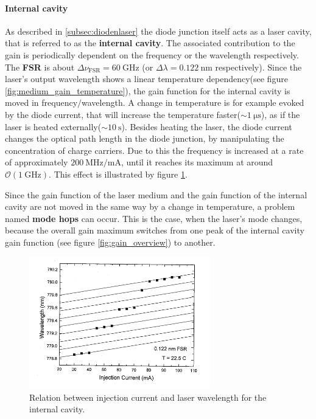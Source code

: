 \paragraph{Internal cavity}
As described in \ref{subsec:diodenlaser} the diode junction itself
acts as a laser cavity, that is referred to as the \textbf{internal cavity}.
The associated contribution to the gain is periodically dependent on
the frequency or the wavelength respectively. The \textbf{FSR} is about
$\Delta\nu_{\text{FSR}} = \SI{60}{\giga\hertz}$ (or
$\Delta\lambda = \SI{0.122}{\nano\meter}$ respectively).
Since the laser's output wavelength shows a linear
temperature dependency(see figure \ref{fig:medium_gain_temperature}),
the gain function for the internal cavity is moved in frequency$/$wavelength.
A change in temperature is for example evoked by the diode current,
that will increase the temperature faster($\sim \SI{1}{\micro\second}$),
as if the laser is heated externally($\sim \SI{10}{\second}$).
Besides heating the laser, the diode current changes the optical
path length in the diode junction, by manipulating the concentration
of charge carriers. Due to this the frequency is increased at a rate of
approximately $\SI{200}{\mega\hertz\per\milli\ampere}$, until it reaches
its maximum at around $\mathcal{O}(\SI{1}{\giga\hertz})$.
This effect is illustrated by figure \ref{fig:injectioncurrent_wavelength}.


Since the gain function of the laser medium and the gain function of
the internal cavity are not moved in the same way by a change in temperature,
a problem named \textbf{mode hops} can occur. This is the case,
when the laser's mode changes, because the overall gain maximum
switches from one peak of the internal cavity
gain function (see figure \ref{fig:gain_overview}) to another.


\FloatBarrier
\begin{figure}
  \centering
  \includegraphics[width=0.7\textwidth]{injectioncurrent_wavelength.png}
  \caption{Relation between injection current and laser wavelength for the internal cavity.\cite{V60}}
  \label{fig:injectioncurrent_wavelength}
\end{figure}
\FloatBarrier



